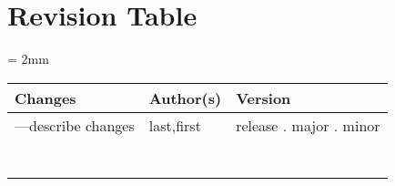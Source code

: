 \documentclass[class=Report, crop=false]{standalone}
\begin{document}
\section*{Revision Table}

\begin{table}[H]
\centering
\scriptsize
\tabulinesep = 2mm
\begin{tabu}{|P{3.5in}|P{1.5in}|P{1in}|} \hline
\textbf{Changes} & \textbf{Author(s)} & \textbf{Version} \\ \hline
[yyyy/mm/dd]---describe changes & last,first & release . major . minor\\ \hline
 & & \\ \hline
 & & \\ \hline
 & & \\ \hline
 & & \\ \hline
 & & \\ \hline
 & & \\ \hline
 & & \\ \hline
\end{tabu}
\end{table}
\end{document}
